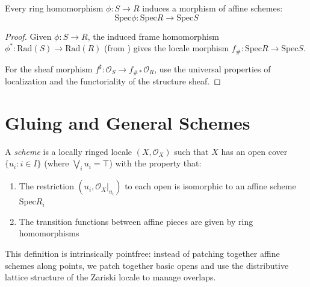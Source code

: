 \begin{theorem}
  \label{thm:ring-hom-to-scheme-morphism}
  \leanok
  Every ring homomorphism $\phi: S \to R$ induces a morphism of affine schemes:
  $$\mathrm{Spec} \phi: \mathrm{Spec} R \to \mathrm{Spec} S$$
\end{theorem}

\begin{proof}
  \leanok
  Given $\phi: S \to R$, the induced frame homomorphism $\phi^*: \mathrm{Rad}(S) \to \mathrm{Rad}(R)$
  (from ) gives the locale morphism $f_{\#}: \mathrm{Spec} R \to \mathrm{Spec} S$.

  For the sheaf morphism $f^{\sharp}: \mathcal{O}_S \to f_{\#*}\mathcal{O}_R$, use the universal properties of localization and the functoriality of the structure sheaf.
\end{proof}

\section{Gluing and General Schemes}

\begin{definition}
  \label{def:scheme-pointfree}
  A \emph{scheme} is a locally ringed locale $(X, \mathcal{O}_X)$ such that $X$ has an open cover 
  $\{u_i : i \in I\}$ (where $\bigvee_i u_i = \top$) with the property that:
  \begin{enumerate}
    \item The restriction $(u_i, \mathcal{O}_X|_{u_i})$ to each open is isomorphic to an affine scheme $\mathrm{Spec} R_i$
    \item The transition functions between affine pieces are given by ring homomorphisms
  \end{enumerate}
\end{definition}

\begin{remark}
  \label{remark:pointfree-gluing}
  This definition is intrinsically pointfree: instead of patching together affine schemes along points, 
  we patch together basic opens and use the distributive lattice structure of the Zariski locale to manage overlaps.
\end{remark}

